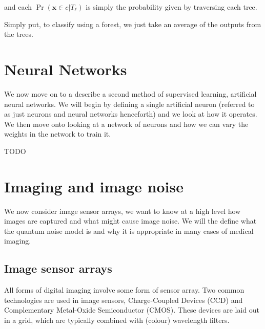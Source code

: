 \documentclass[12pt,twoside,notitlepage]{report}
\newcommand{\vc}[1]{\mathbf{#1}}
\begin{document}
            and each $\Pr(\vc{x} \in c | T_\ell)$ is simply the probability given by traversing each tree. \cite{criminisi2013decision}

            Simply put, to classify using a forest, we just take an average of the outputs from the trees. 





    \section{Neural Networks}
        We now move on to a describe a second method of supervised learning, artificial neural networks. We will begin 
        by defining a single artificial neuron (referred to as just neurons and neural networks henceforth) and we look 
        at how it operates. We then move onto looking at a network of neurons and how we can vary the weights in the 
        network to train it. 

        \begin{framed}
            TODO
        \end{framed}





    \section{Imaging and image noise} 
        We now consider image sensor arrays, we want to know at a high level how images are captured and what might 
        cause image noise. We will the define what the quantum noise model is and why it is appropriate in many 
        cases of medical imaging. 

        \subsection{Image sensor arrays}
            All forms of digital imaging involve some form of sensor array. Two common technologies are used in image 
            sensors, Charge-Coupled Devices (CCD) and Complementary Metal-Oxide Semiconductor (CMOS). These devices are 
            laid out in a grid, which are typically combined with (colour) wavelength filters. 
\end{document}
